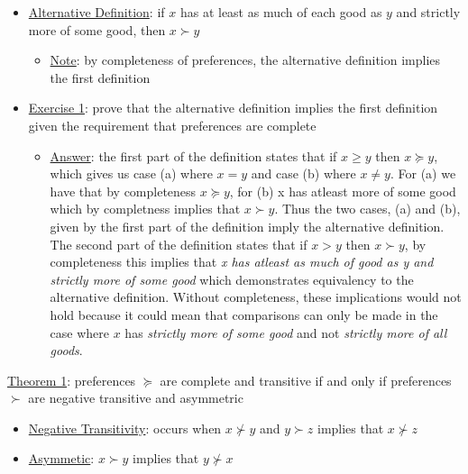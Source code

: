\documentclass{article}
\begin{document}
  \begin{itemize}
    \item  \underline{Alternative Definition}: if $x$ has at least as much of each good as $y$ and strictly more of some good, then $x \succ y$
    \begin{itemize}
      \item  \underline{Note}: by completeness of preferences, the alternative definition implies the first definition
    \end{itemize}
    \item  \underline{Exercise 1}: prove that the alternative definition implies the first definition given the requirement that preferences are complete
    \begin{itemize}
      \item  \underline{Answer}: the first part of the definition states that if $x \geq y$ then $x \succeq y$, which gives us case (a) where $x = y$ and case (b) where $x \neq y$. For (a) we have that by completeness $x \succeq y$, for (b) x has atleast more of some good which by completness implies that $x \succ y$. Thus the two cases, (a) and (b), given by the first part of the definition imply the alternative definition. The second part of the definition states that if $x > y$ then $x \succ y$, by completeness this implies that \textit{x has atleast as much of good as y and strictly more of some good} which demonstrates equivalency to the alternative definition. Without completeness, these implications would not hold because it could mean that comparisons can only be made in the case where $x$ has \textit{strictly more of some good} and not \textit{strictly more of all goods}.
    \end{itemize}
  \end{itemize}
  \par
  \underline{Theorem 1}: preferences $\succeq$ are complete and transitive if and only if preferences $\succ$ are negative transitive and asymmetric
  \begin{itemize}
    \item  \underline{Negative Transitivity}: occurs when $x \nsucc y$ and $y \succ z$ implies that $x \nsucc z$
    \item  \underline{Asymmetic}: $x \succ y$ implies that $y \nsucc x$
  \end{itemize}
  \par
\vspace{6mm}
\end{document}
